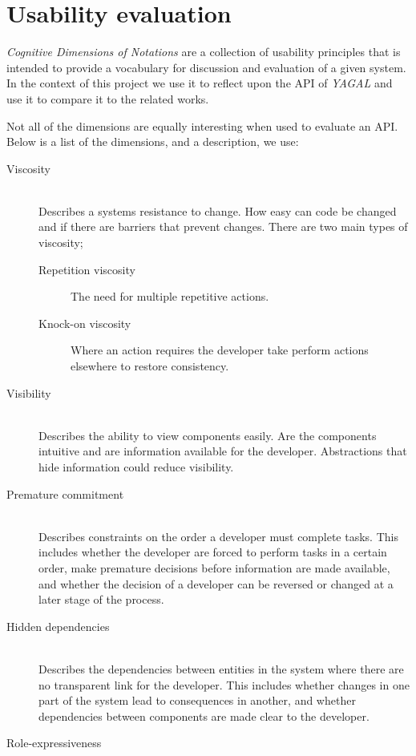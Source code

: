 \section{Usability evaluation}
\textit{Cognitive Dimensions of Notations} are a collection of usability principles that is intended to provide a vocabulary for discussion and evaluation of a given system. In the context of this project we use it to reflect upon the API of \textit{YAGAL} and use it to compare it to the related works.

 Not all of the dimensions are equally interesting when used to evaluate an API. Below is a list of the dimensions, and a description, we use:
\begin{description}
    \item[Viscosity]\hfill\\
    Describes a systems resistance to change. How easy can code be changed and if there are barriers that prevent changes. There are two main types of viscosity;
    \begin{description}
    \item[Repetition viscosity] The need for multiple repetitive actions.
        \item[Knock-on viscosity] Where an action requires the developer take perform actions elsewhere to restore consistency. 
    \end{description}
    \item[Visibility]\hfill\\
    Describes the ability to view components easily. Are the components intuitive and are information available for the developer. Abstractions that hide information could reduce visibility.
    \item[Premature commitment]\hfill\\
    Describes constraints on the order a developer must complete tasks. This includes whether the developer are forced to perform tasks in a certain order, make premature decisions before information are made available, and whether the decision of a developer can be reversed or changed at a later stage of the process.
    \item[Hidden dependencies]\hfill\\ %
    Describes the dependencies between entities in the system where there are no transparent link for the developer. This includes whether changes in one part of the system lead to consequences in another, and whether dependencies between components are made clear to the developer.
    \item[Role-expressiveness]\hfill\\

\end{description}
